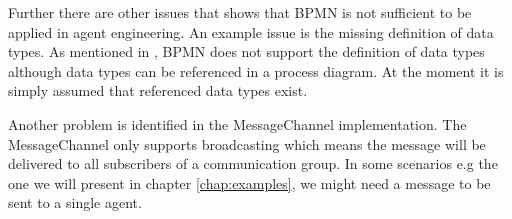Further there are other issues that shows that BPMN is not sufficient to be applied in agent engineering. An example issue is the missing definition of data types. As mentioned in \cite{TKMLAH2010}, BPMN does not support the definition of data types although data types can be referenced in a process diagram. At the moment it is simply assumed that referenced data types exist.

Another problem is identified in the MessageChannel implementation. The MessageChannel only supports broadcasting which means the message will be delivered to all subscribers of a communication group. In some scenarios e.g the one we will present in chapter \ref{chap:examples}, we might need a message to be sent to a single agent.  